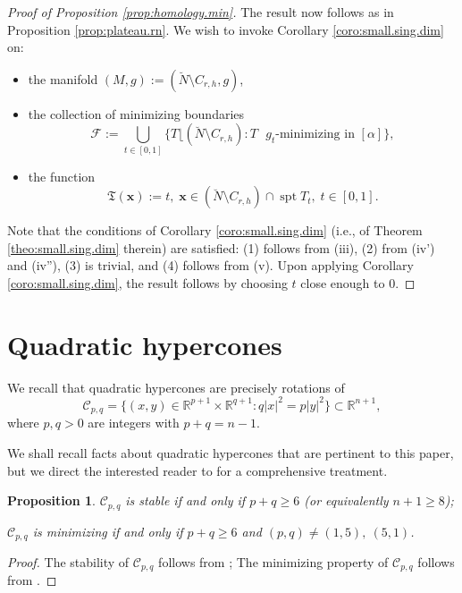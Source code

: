 \documentclass[11pt, letterpaper, reqno]{amsart}
\numberwithin{equation}{section}
\newtheorem{Prop}[Def]{Proposition}
\theoremstyle{remark}
\newcommand{\RR}{\mathbb{R}}
\newcommand{\cC}{\mathcal{C}}
\newcommand{\mbfx}{\mathbf{x}}
\newcommand{\frT}{\mathfrak{T}}
\newcommand{\spt}{\operatorname{spt}}
\newcommand{\mres}{\lfloor}
\begin{document}
\begin{proof}[Proof of Proposition \ref{prop:homology.min}]
	The result now follows as in Proposition \ref{prop:plateau.rn}. We wish to invoke Corollary \ref{coro:small.sing.dim} on:
	\begin{itemize}
		\item the manifold $(M, g) := (\breve N \setminus C_{r,h}, g)$,
		\item the collection of minimizing boundaries
		\[ \mathscr{F} := \bigcup_{t \in [0,1]} \{ T \mres (\breve N \setminus C_{r,h}) : T \text{ $g_t$-minimizing in } [\alpha] \}, \]
		\item the function
		\[ \frT(\mbfx) := t, \; \mbfx \in (\breve N \setminus C_{r,h}) \cap \spt T_t, \; t \in [0, 1]. \]
	\end{itemize}
	Note that the conditions of Corollary \ref{coro:small.sing.dim} (i.e., of Theorem \ref{theo:small.sing.dim} therein) are satisfied: (1) follows from (iii), (2) from (iv') and (iv''), (3) is trivial, and (4) follows from (v). Upon applying Corollary \ref{coro:small.sing.dim}, the result follows by choosing $t$ close enough to $0$.
\end{proof}



\appendix


\section{Quadratic hypercones} \label{app:quadratic}

We recall that quadratic hypercones are precisely rotations of 
\[ \cC_{p,q} = \{ (x, y) \in \RR^{p+1} \times \RR^{q+1} : q |x|^2 = p |y|^2 \} \subset \RR^{n+1}, \]
where $p, q > 0$ are integers with $p+q = n-1$. 

We shall recall facts about quadratic hypercones that are pertinent to this paper, but we direct the interested reader to \cite{Simoes:quadratic, SimonSolomon:quadratic, EdelenSpolaor:quadratic} for a comprehensive treatment.
\begin{Prop}
  $\cC_{p,q}$ is stable if and only if $p+q\geq 6$ (or equivalently $n+1\geq 8$);

  $\cC_{p,q}$ is minimizing if and only if $p+q\geq 6$ and $(p, q)\neq (1, 5),\ (5, 1)$.
\end{Prop}
\begin{proof}
  The stability of $\cC_{p,q}$ follows from \cite{Simons:minvar}; The minimizing property of $\cC_{p, q}$ follows from \cite{BDG:Simons, Lawson72, Simoes:quadratic}.
\end{proof}
\end{document}
